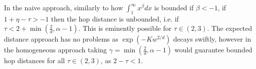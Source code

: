 In the naive approach, similarly to how $\int_1^\infty x^{\beta} dx$ is bounded if $\beta < -1$, if $1 + \eta - \tau > -1$ then the hop distance is unbounded, i.e. if $\tau < 2 + \min(\frac{2}{d}, \alpha - 1)$. This is eminently possible for $\tau \in (2, 3)$. The expected distance approach has no problems as $\exp(-K w^{2/d})$ decays swiftly, however in the homogeneous approach taking $\gamma = \min(\frac{2}{d}, \alpha -1)$ would guarantee bounded hop distances for all $\tau \in (2, 3)$, as $2 - \tau < 1$.






